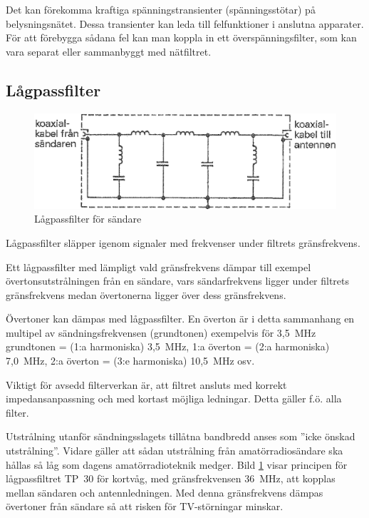 Det kan förekomma kraftiga spänningstransienter (spänningsstötar) på
belysningsnätet.
Dessa transienter kan leda till felfunktioner i anslutna apparater.
För att förebygga sådana fel kan man koppla in ett överspänningsfilter, som kan
vara separat eller sammanbyggt med nätfiltret.

\subsection{Lågpassfilter}

\begin{figure}
  \includegraphics[width=\textwidth]{images/cropped_pdfs/bild_2_9-02.pdf}
  \caption{Lågpassfilter för sändare}
  \label{fig:bildII9-2}
\end{figure}

Lågpassfilter släpper igenom signaler med frekvenser under filtrets
gränsfrekvens.

Ett lågpassfilter med lämpligt vald gränsfrekvens dämpar till exempel
övertonsutstrålningen från en sändare, vars sändarfrekvens ligger under filtrets
gränsfrekvens medan övertonerna ligger över dess gränsfrekvens.

Övertoner kan dämpas med lågpassfilter.
En överton är i detta sammanhang en multipel av sändningsfrekvensen
(grundtonen) exempelvis för
3,5~MHz grundtonen = (1:a harmoniska) 3,5~MHz,
1:a överton = (2:a harmoniska) 7,0~MHz,
2:a överton = (3:e harmoniska) 10,5~MHz osv.

Viktigt för avsedd filterverkan är, att filtret ansluts med korrekt
impedansanpassning och med kortast möjliga ledningar.
Detta gäller f.ö. alla filter.

Utstrålning utanför sändningsslagets tillåtna bandbredd anses som
''icke önskad utstrålning''.
Vidare gäller att sådan utstrålning från amatörradiosändare ska hållas så låg
som dagens amatörradioteknik medger.
Bild \ref{fig:bildII9-2} visar principen för lågpassfiltret TP~30 för kortvåg,
med gränsfrekvensen 36~MHz, att kopplas mellan sändaren och antennledningen.
Med denna gränsfrekvens dämpas övertoner från sändare så att risken för
TV-störningar minskar.

